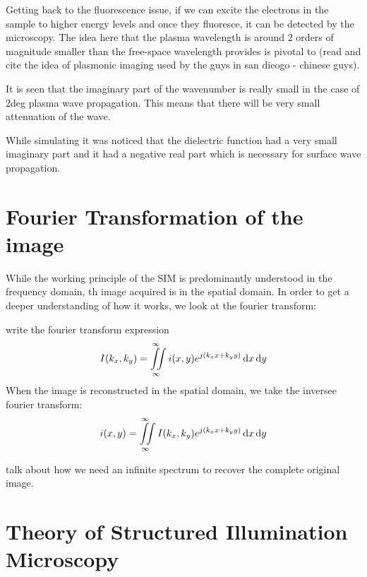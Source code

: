 \documentclass[11pt]{article}
\begin{document}
Getting back to the fluorescence issue, if we can excite the electrons in the sample to higher energy levels and once they fluoresce, it can be detected by the microscopy. The idea here that the plasma wavelength is around 2 orders of magnitude smaller than the free-space wavelength provides is pivotal to (read and cite the idea of plasmonic imaging used by the guys in san dieogo - chinese guys).

It is seen that the imaginary part of the wavenumber is really small in the case of 2deg plasma wave propagation. This means that there will be very small attenuation of the wave.

While simulating it was noticed that the dielectric function had a very small imaginary part and it had a negative real part which is necessary for surface wave propagation.

\section{Fourier Transformation of the image}

While the working principle of the SIM is predominantly understood in the frequency domain, th image acquired is in the spatial domain. In order to get a deeper understanding of how it works, we look at the fourier transform:

write the fourier transform expression
\begin{equation}
  I(k_x, k_y) = \iint \limits_{\infty}^{\infty} i(x,y) e^{j (k_x x + k_y y)} \mathop{}\!\mathrm{d} x \mathop{}\!\mathrm{d} y
  \label{eq:FT}
\end{equation}
When the image is reconstructed in the spatial domain, we take the inversee fourier transform:
\begin{equation}
  i(x, y) = \iint \limits_{\infty}^{\infty} I(k_x,k_y) e^{j (k_x x + k_y y)} \mathop{}\!\mathrm{d} x \mathop{}\!\mathrm{d} y
  \label{eq:IFT}
\end{equation}

talk about how we need an infinite spectrum to recover the complete original image.

\section{Theory of Structured Illumination Microscopy}
\end{document}
